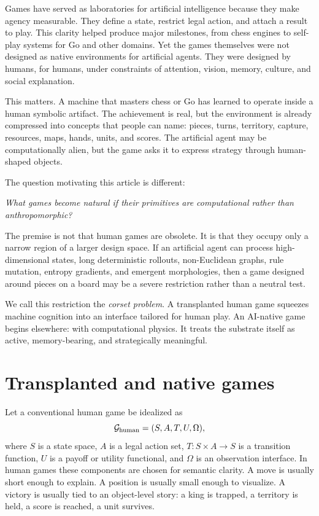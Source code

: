Games have served as laboratories for artificial intelligence because they make agency measurable. They define a state, restrict legal action, and attach a result to play. This clarity helped produce major milestones, from chess engines to self-play systems for Go and other domains. Yet the games themselves were not designed as native environments for artificial agents. They were designed by humans, for humans, under constraints of attention, vision, memory, culture, and social explanation.

This matters. A machine that masters chess or Go has learned to operate inside a human symbolic artifact. The achievement is real, but the environment is already compressed into concepts that people can name: pieces, turns, territory, capture, resources, maps, hands, units, and scores. The artificial agent may be computationally alien, but the game asks it to express strategy through human-shaped objects.

The question motivating this article is different:
\begin{center}
  \emph{What games become natural if their primitives are computational rather than anthropomorphic?}
\end{center}
The premise is not that human games are obsolete. It is that they occupy only a narrow region of a larger design space. If an artificial agent can process high-dimensional states, long deterministic rollouts, non-Euclidean graphs, rule mutation, entropy gradients, and emergent morphologies, then a game designed around pieces on a board may be a severe restriction rather than a neutral test.

We call this restriction the \emph{corset problem}. A transplanted human game squeezes machine cognition into an interface tailored for human play. An AI-native game begins elsewhere: with computational physics. It treats the substrate itself as active, memory-bearing, and strategically meaningful.

\section{Transplanted and native games}\label{sec:transplanted-native}

Let a conventional human game be idealized as
\[
  \mathcal{G}_{\mathrm{human}}=(S,A,T,U,\Omega),
\]
where $S$ is a state space, $A$ is a legal action set, $T:S\times A\to S$ is a transition function, $U$ is a payoff or utility functional, and $\Omega$ is an observation interface. In human games these components are chosen for semantic clarity. A move is usually short enough to explain. A position is usually small enough to visualize. A victory is usually tied to an object-level story: a king is trapped, a territory is held, a score is reached, a unit survives.

